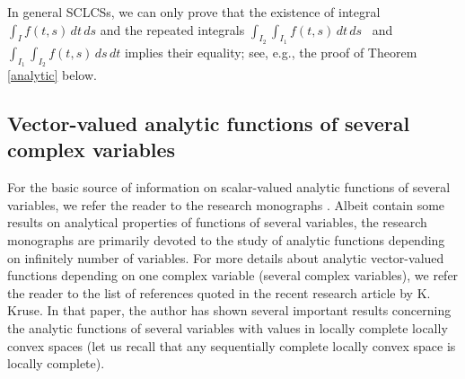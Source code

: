 \documentclass{amsart}
\theoremstyle{definition}
\theoremstyle{remark}
\numberwithin{equation}{section}
\begin{document}
In general SCLCSs, we can only prove that the existence of integral $
\int_{I}f(t,s)\, dt\, ds$ and the repeated integrals
$
\int_{I_{2}}\int_{I_{1}}f(t,s)\, dt\, ds$ \mbox{ and }$ \int_{I_{1}}\int_{I_{2}}f(t,s)\, ds\, dt
$ implies their equality; see, e.g., the proof of Theorem \ref{analytic} below.

\subsection{Vector-valued analytic functions of several complex variables}\label{zver}

For the basic source of information on scalar-valued analytic functions of several variables, we refer the reader to the research monographs
\cite{alexander,adachi,gun,jar,hermander,kaup,range}. Albeit contain  some results on analytical properties of functions of several variables, the research monographs \cite{dina1,dina2,mujica} are primarily devoted to the study of analytic functions depending on infinitely number of variables. For more details about analytic vector-valued functions depending on one complex variable (several complex variables), we refer the reader to the list of references quoted in the recent research article \cite{kruse} by K. Kruse. In that paper, the author has shown several important results concerning the analytic functions of several variables with values in locally complete locally convex spaces (let us recall that any sequentially complete locally convex space is locally complete). 
\end{document}
